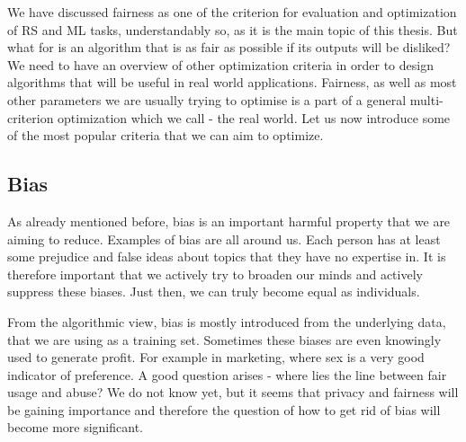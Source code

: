 
We have discussed fairness as one of the criterion for evaluation and optimization of RS and ML tasks, understandably so, as it is the main topic of this thesis. But what for is an algorithm that is as fair as possible if its outputs will be disliked? We need to have an overview of other optimization criteria in order to design algorithms that will be useful in real world applications. Fairness, as well as most other parameters we are usually trying to optimise is a part of a general multi-criterion optimization which we call - the real world. Let us now introduce some of the most popular criteria that we can aim to optimize.



\subsection{Bias}
As already mentioned before, bias is an important harmful property that we are aiming to reduce. Examples of bias are all around us. Each person has at least some prejudice and false ideas about topics that they have no expertise in. It is therefore important that we actively try to broaden our minds and actively suppress these biases. Just then, we can truly become equal as individuals.

From the algorithmic view, bias is mostly introduced from the underlying data, that we are using as a training set. Sometimes these biases are even knowingly used to generate profit. For example in marketing, where sex is a very good indicator of preference. A good question arises - where lies the line between fair usage and abuse? We do not know yet, but it seems that privacy and fairness will be gaining importance and therefore the question of how to get rid of bias will become more significant.


